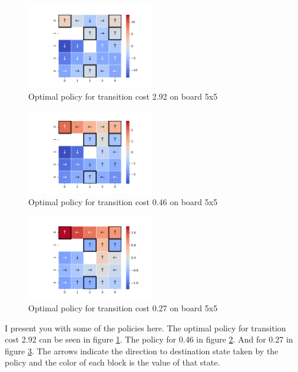 \documentclass[10pt,journal,compsoc,twoside]{IEEEtran}
\begin{document}
\begin{figure}
    \caption{Optimal policy for transition cost 2.92 on board 5x5}
    \label{fig:e2p1}
        \includegraphics[width=0.5\textwidth, angle=0]{figures/e2_policy_1.pdf}
\end{figure}
\begin{figure}
    \caption{Optimal policy for transition cost 0.46 on board 5x5}
    \label{fig:e2p2}
        \includegraphics[width=0.5\textwidth, angle=0]{figures/e2_policy_2.pdf}
\end{figure}
\begin{figure}
    \caption{Optimal policy for transition cost 0.27 on board 5x5}
    \label{fig:e2p3}
        \includegraphics[width=0.5\textwidth, angle=0]{figures/e2_policy_3.pdf}
\end{figure}

I present you with some of the policies here. The optimal policy for transition cost 2.92 can be seen in figure \ref{fig:e2p1}. The policy for 0.46 in figure \ref{fig:e2p2}. And for 0.27 in figure \ref{fig:e2p3}.
The arrows indicate the direction to destination state taken by the policy and the color of each
block is the value of that state.
\end{document}
